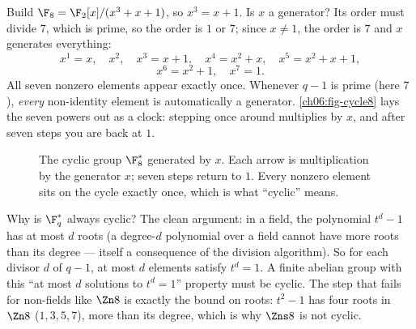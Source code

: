 \begin{example}[A generator of $\F_8^{*}$]
\label{ch06:ex-gen8}
Build $\F_8 = \F_2[x]/(x^3+x+1)$, so $x^3 = x+1$. Is $x$ a generator? Its
order must divide $7$, which is prime, so the order is $1$ or $7$; since
$x \neq 1$, the order is $7$ and $x$ generates everything:
\[
x^1=x,\quad x^2,\quad x^3=x+1,\quad x^4 = x^2+x,\quad x^5 = x^2+x+1,
\]
\[
x^6 = x^2+1,\quad x^7 = 1.
\]
All seven nonzero elements appear exactly once. Whenever $q-1$ is prime
(here $7$), \emph{every} non-identity element is automatically a generator.
\autoref{ch06:fig-cycle8} lays the seven powers out as a clock: stepping once
around multiplies by $x$, and after seven steps you are back at $1$.
\end{example}

\begin{figure}[H]
\centering
{}
\caption{The cyclic group $\F_8^{*}$ generated by $x$. Each arrow is
multiplication by the generator $x$; seven steps return to $1$. Every nonzero
element sits on the cycle exactly once, which is what ``cyclic'' means.}
\label{ch06:fig-cycle8}
\end{figure}

\begin{whybox}
Why is $\F_q^{*}$ always cyclic? The clean argument: in a field, the
polynomial $t^d - 1$ has at most $d$ roots (a degree-$d$ polynomial over a
field cannot have more roots than its degree --- itself a consequence of the
division algorithm). So for each divisor $d$ of $q-1$, at most $d$ elements
satisfy $t^d = 1$. A finite abelian group with this ``at most $d$ solutions
to $t^d=1$'' property must be cyclic. The step that fails for non-fields like
$\Zn 8$ is exactly the bound on roots: $t^2-1$ has four roots in $\Zn 8$
($1,3,5,7$), more than its degree, which is why $\Zns 8$ is not cyclic.
\end{whybox}

